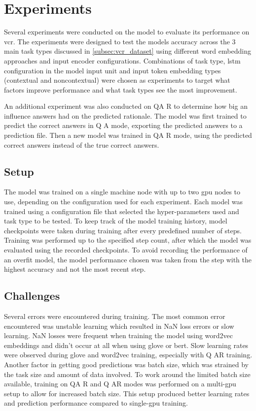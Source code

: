 \chapter{Experiments}
\label{chp:experiments}

Several experiments were conducted on the model to evaluate its performance on \gls{vcr}.
The experiments were designed to test the models accuracy across the 3 main task types discussed in \ref{subsec:vcr_dataset} using different word embedding approaches and input encoder configurations.
Combinations of task type, \gls{lstm} configuration in the model input unit and input token embedding types (contextual and noncontextual) were chosen as experiments to target what factors improve performance and what task types see the most improvement.

An additional experiment was also conducted on QA \rightarrow R to determine how big an influence answers had on the predicted rationale.
The model was first trained to predict the correct answers in Q \rightarrow A mode, exporting the predicted answers to a prediction file.
Then a new model was trained in QA \rightarrow R mode, using the predicted correct answers instead of the true correct answers.

\section{Setup}
\label{sec:experiment-setup}

The model was trained on a single machine node with up to two \acrshort{gpu} nodes to use, depending on the configuration used for each experiment.
Each model was trained using a configuration file that selected the hyper-parameters used and task type to be tested.
To keep track of the model training history, model checkpoints were taken during training after every predefined number of steps.
Training was performed up to the specified step count, after which the model was evaluated using the recorded checkpoints.
To avoid recording the performance of an overfit model, the model performance chosen was taken from the step with the highest accuracy and not the most recent step.

\section{Challenges}
\label{sec:experiment-challenges}

Several errors were encountered during training.
The most common error encountered was unstable learning which resulted in NaN loss errors or slow learning.
NaN losses were frequent when training the model using word2vec embeddings and didn't occur at all when using glove or bert.
Slow learning rates were observed during glove and word2vec training, especially with Q \rightarrow AR training.
Another factor in getting good predictions was batch size, which was strained by the task size and amount of data involved.
To work around the limited batch size available, training on QA \rightarrow R and Q \rightarrow AR modes was performed on a multi-gpu setup to allow for increased batch size.
This setup produced better learning rates and prediction performance compared to single-gpu training.

